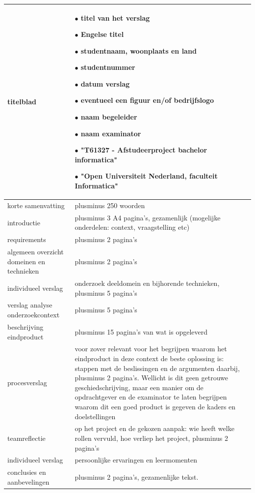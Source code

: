 \begin{center}
\begin{tabular}{p{10em}p{25em}}
\hline
 titelblad &  	\par $\bullet$ titel van het verslag
		\par $\bullet$ Engelse titel
		\par $\bullet$ studentnaam, woonplaats en land
		\par $\bullet$ studentnummer
		\par $\bullet$ datum verslag
		\par $\bullet$ eventueel een figuur en/of bedrijfslogo
		\par $\bullet$ naam begeleider
		\par $\bullet$ naam examinator
		\par $\bullet$ "T61327 - Afstudeerproject bachelor informatica"
		\par $\bullet$ "Open Universiteit Nederland, faculteit Informatica"
 \\\hline
 korte samenvatting &  plusminus 250 woorden
 \\\hline
 introductie &  plusminus 3 A4 pagina's, gezamenlijk (mogelijke onderdelen:
context, vraagstelling etc)
 \\\hline
 requirements & plusminus 2 pagina's
 \\\hline
 algemeen overzicht domeinen en technieken & plusminus 2 pagina's
 \\\hline
    individueel verslag & onderzoek deeldomein en bijhorende technieken, plusminus
			5 pagina's
 \\\hline
    verslag analyse onderzoekcontext & plusminus 5 pagina's
 \\\hline
    beschrijving eindproduct & plusminus 15 pagina’s van wat is opgeleverd
 \\\hline
    procesverslag & voor zover relevant voor het begrijpen waarom het eindproduct
		in deze context de beste oplossing is: stappen met de beslissingen en de
		argumenten daarbij, plusminus 2 pagina's. Wellicht is dit geen getrouwe
		geschiedschrijving, maar een manier om de opdrachtgever en de examinator te
		laten begrijpen waarom dit een goed product is gegeven de kaders en
		doelstellingen
 \\\hline
    teamreflectie & op het project en de gekozen aanpak: wie heeft welke rollen
		    vervuld, hoe verliep het project, plusminus 2 pagina's
 \\\hline
    individueel verslag & persoonlijke ervaringen en leermomenten
 \\\hline
    conclusies en aanbevelingen & plusminus 2 pagina's, gezamenlijke tekst.
 \\\hline
\end{tabular}
\end{center}

